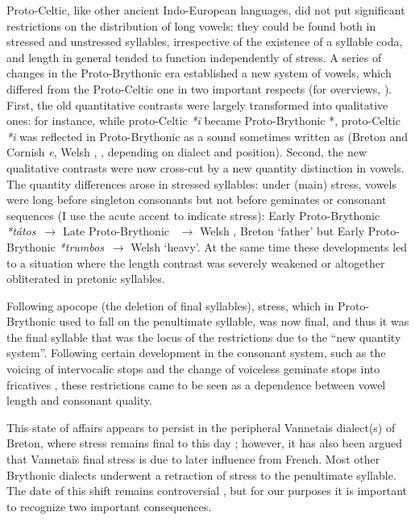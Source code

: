 Proto\hyp Celtic, like other ancient Indo\hyp European languages, did not put significant restrictions on the distribution of long vowels: they could be found both in stressed and unstressed syllables, irrespective of the existence of a syllable coda, and length in general tended to function independently of stress. A series of changes in the Proto\hyp Brythonic era established a new system of vowels, which differed from the Proto\hyp Celtic one in two important respects (for overviews, \cf \citealt{lheb,mccone,schrijver95:_studies_britis_celtic,schrijver11:_old_britis}). First, the old quantitative contrasts were largely transformed into qualitative ones: for instance, while proto\hyp Celtic \emph{*ī} became Proto\hyp Brythonic *, proto\hyp Celtic \emph{*i} was reflected in Proto\hyp Brythonic as a sound sometimes written as \emph{} (Breton and Cornish \emph{e}, Welsh , ,  depending on dialect and position). Second, the new qualitative contrasts were now cross\hyp cut by a new quantity distinction in vowels. The quantity differences arose in stressed syllables: under (main) stress, vowels were long before singleton consonants but not before geminates or consonant sequences (I use the acute accent to indicate stress): Early Proto\hyp Brythonic \emph{*tátos}~$\rightarrow$ Late Proto-Brythonic \emph{}~$\rightarrow$ Welsh \ipa{[ˈtaːd]}, Breton \ipa{[ˈtaːt]} `father' but Early Proto\hyp Brythonic \emph{*trumbos}~$\rightarrow$ Welsh \ipa{[ˈtrum]} `heavy'. At the same time these developments led to a situation where the length contrast was severely weakened or altogether obliterated in pretonic syllables.

Following apocope (\ie the deletion of final syllables), stress, which in Proto\hyp Brythonic used to fall on the penultimate syllable, was now final, and thus it was the final syllable that was the locus of the restrictions due to the \enquote{new quantity system}. Following certain development in the consonant system, such as the voicing of intervocalic stops and the change of voiceless geminate stops  into fricatives , these restrictions came to be seen as a dependence between vowel length and consonant quality.

This state of affairs appears to persist in the peripheral Vannetais dialect(s) of Breton, where stress remains final to this day \citep[\egm][]{Ter70,mckenna,le00:_le_malguen,le08:_etude,cheveau07:_approc_grand_lorien}; however, it has also been argued that Vannetais final stress is due to later influence from French. Most other Brythonic dialects underwent a retraction of stress to the penultimate syllable. The date of this shift remains controversial \citep{lheb,watkins72:_old_welsh,watkins76:_cyfnew_gymraeg}, but for our purposes it is important to recognize two important consequences.

